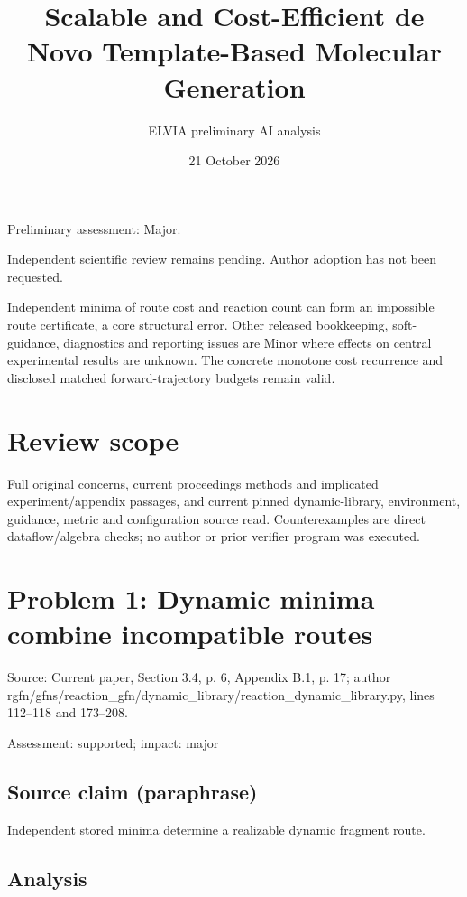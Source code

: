 \documentclass[11pt]{article}
\begin{document}
\title{Scalable and Cost-Efficient de Novo Template-Based Molecular Generation}

\author{ELVIA preliminary AI analysis}\date{21 October 2026}\maketitle

Preliminary assessment: Major.\par

Independent scientific review remains pending. Author adoption has not been requested.

Independent minima of route cost and reaction count can form an impossible route certificate, a core structural error. Other released bookkeeping, soft-guidance, diagnostics and reporting issues are Minor where effects on central experimental results are unknown. The concrete monotone cost recurrence and disclosed matched forward-trajectory budgets remain valid.

\section*{Review scope}

Full original concerns, current proceedings methods and implicated experiment/appendix passages, and current pinned dynamic-library, environment, guidance, metric and configuration source read. Counterexamples are direct dataflow/algebra checks; no author or prior verifier program was executed.

\section*{Problem 1: Dynamic minima combine incompatible routes}

Source: Current paper, Section 3.4, p. 6, Appendix B.1, p. 17; author rgfn/gfns/reaction\_gfn/dynamic\_library/reaction\_dynamic\_library.py, lines 112–118 and 173–208.

Assessment: supported; impact: major

\subsection*{Source claim (paraphrase)}

Independent stored minima determine a realizable dynamic fragment route.

\subsection*{Analysis}
\end{document}
